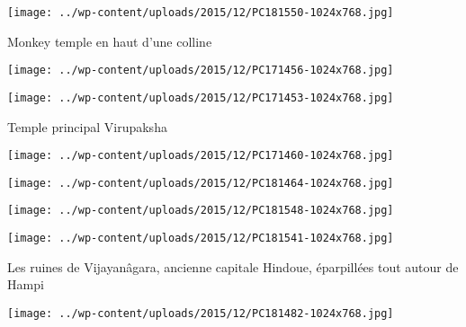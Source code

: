 \begin{center} \texttt{[image: ../wp-content/uploads/2015/12/PC181550-1024x768.jpg]} \end{center}

 

 Monkey temple en haut d'une colline 

 

\begin{center} \texttt{[image: ../wp-content/uploads/2015/12/PC171456-1024x768.jpg]} \end{center}

 

 

\begin{center} \texttt{[image: ../wp-content/uploads/2015/12/PC171453-1024x768.jpg]} \end{center}

 

 Temple principal Virupaksha 

 

\begin{center} \texttt{[image: ../wp-content/uploads/2015/12/PC171460-1024x768.jpg]} \end{center}

 

 

\begin{center} \texttt{[image: ../wp-content/uploads/2015/12/PC181464-1024x768.jpg]} \end{center}

 

 

\begin{center} \texttt{[image: ../wp-content/uploads/2015/12/PC181548-1024x768.jpg]} \end{center}

 

 

\begin{center} \texttt{[image: ../wp-content/uploads/2015/12/PC181541-1024x768.jpg]} \end{center}

 

 Les ruines de Vijayanâgara, ancienne capitale Hindoue, éparpillées tout autour de Hampi 

 

\begin{center} \texttt{[image: ../wp-content/uploads/2015/12/PC181482-1024x768.jpg]} \end{center}

